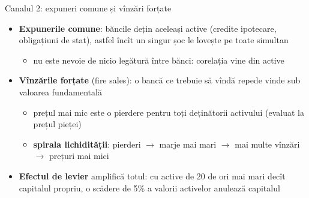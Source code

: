 \begin{frame}{Canalul 2: expuneri comune și vînzări forțate}
\itemsize{\small}
\begin{itemize}
    \item \textbf{Expunerile comune}: băncile dețin aceleași active (credite ipotecare, obligațiuni de stat), astfel încît un singur șoc le lovește pe toate simultan
    \begin{itemize}
        \item nu este nevoie de nicio legătură între bănci: corelația vine din active
    \end{itemize}
    \item \textbf{Vînzările forțate} (fire sales): o bancă ce trebuie să vîndă repede vinde sub valoarea fundamentală 
    \begin{itemize}
        \item prețul mai mic este o pierdere pentru toți deținătorii activului (evaluat la prețul pieței)
        \item \textbf{spirala lichidității}: pierderi $\to$ marje mai mari $\to$ mai multe vînzări $\to$ prețuri mai mici 
    \end{itemize}
    \item \textbf{Efectul de levier} amplifică totul: cu active de 20 de ori mai mari decît capitalul propriu, o scădere de 5\% a valorii activelor anulează capitalul
\end{itemize}
\end{frame}

